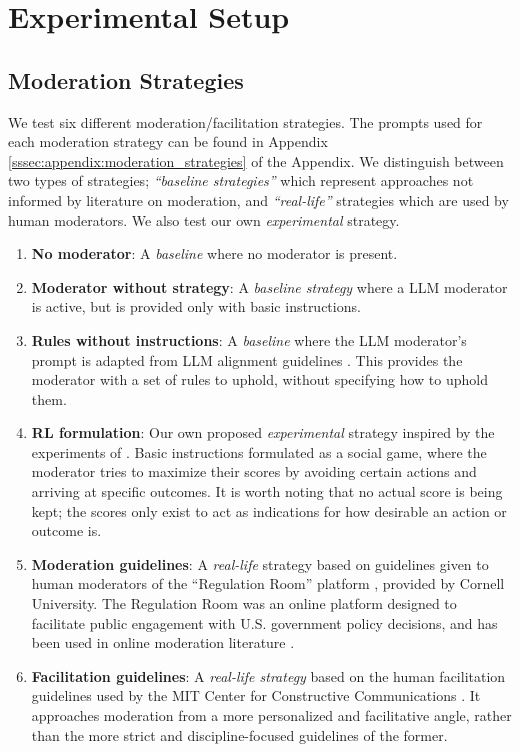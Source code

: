 \section{Experimental Setup}

\subsection{Moderation Strategies}
\label{ssec:setup:strategies}

We test six different moderation/facilitation strategies. The prompts used for each moderation strategy can be found in Appendix \ref{sssec:appendix:moderation_strategies} of the Appendix. We distinguish between two types of strategies; \emph{“baseline strategies”} which represent approaches not informed by literature on moderation, and \emph{“real-life”} strategies which are used by human moderators. We also test our own \emph{experimental} strategy.

\begin{enumerate}[noitemsep]
    \item \textbf{No moderator}: A \emph{baseline} where no moderator is present.

    \item \textbf{Moderator without strategy}: A \emph{baseline strategy} where a \ac{LLM} moderator is active, but is provided only with basic instructions.

    \item \textbf{Rules without instructions}: A \emph{baseline} where the \ac{LLM} moderator's prompt is adapted from \ac{LLM} alignment guidelines \cite{collective_constitution}. This provides the moderator with a set of rules to uphold, without specifying how to uphold them.
    
    \item \textbf{RL formulation}: Our own proposed \emph{experimental} strategy inspired by the experiments of \citet{abdelnabi_negotiations}. Basic instructions formulated as a social game, where the moderator tries to maximize their scores by avoiding certain actions and arriving at specific outcomes. It is worth noting that no actual score is being kept; the scores only exist to act as indications for how desirable an action or outcome is. 

    \item \textbf{Moderation guidelines}: A \emph{real-life} strategy based on guidelines given to human moderators of the “Regulation Room” platform \citep{Cornell_eRulemaking2017}, provided by Cornell University. The Regulation Room was an online platform designed to facilitate public engagement with U.S. government policy decisions, and has been used in online moderation literature \cite{seering_self_moderation, park_et_al_2012_facilitation}.

    \item \textbf{Facilitation guidelines}: A \emph{real-life strategy} based on the human facilitation guidelines used by the MIT Center for Constructive Communications \cite{dimitra-book}. It approaches moderation from a more personalized and facilitative angle, rather than the more strict and discipline-focused guidelines of the former.
\end{enumerate}


